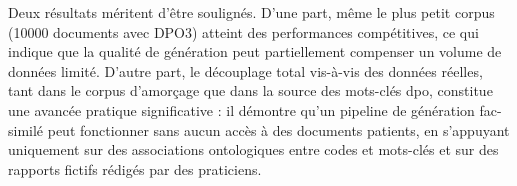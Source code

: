 Deux résultats méritent d'être soulignés.
D'une part, même le plus petit corpus (\num{10000} documents avec DPO3) atteint des performances compétitives, ce qui indique que la qualité de génération peut partiellement compenser un volume de données limité.
D'autre part, le découplage total vis-à-vis des données réelles, tant dans le corpus d'amorçage que dans la source des mots-clés \gls{dpo}, constitue une avancée pratique significative : il démontre qu'un pipeline de génération fac-similé peut fonctionner sans aucun accès à des documents patients, en s'appuyant uniquement sur des associations ontologiques entre codes et mots-clés et sur des rapports fictifs rédigés par des praticiens.
